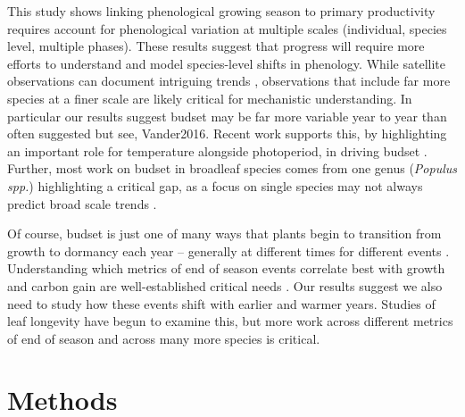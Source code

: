 \documentclass{article}[12pt]
\begin{document}
 This study shows linking phenological growing season to primary productivity requires account for phenological variation at multiple scales (individual, species level, multiple phases). These results suggest that progress will require more efforts to understand and model species-level shifts in phenology. While satellite observations can document intriguing trends \citep[e.g.,][]{Zohner2023}, observations that include far more species at a finer scale are likely critical for mechanistic understanding. In particular our results suggest budset may be far more variable year to year than often suggested \citep{Michelson2018} but see{, Vander2016}. Recent work supports this, by highlighting an important role for temperature alongside photoperiod, in driving budset \citep{Olsen2014,Rohde2011}. Further, most work on budset in broadleaf species comes from one genus (\emph{Populus spp.}) highlighting a critical gap, as a focus on single species may not always predict broad scale trends \citep{Morales-Castilla2024}. 
 
Of course, budset is just one of many ways that plants begin to transition from growth to dormancy each year -- generally at different times for different events \citep{Michelson2018}. Understanding which metrics of end of season events correlate best with growth and carbon gain are well-established critical needs \citep{GALLINAT2015}. Our results suggest we also need to study how these events shift with earlier and warmer years. Studies of leaf longevity have begun to examine this, but more work across different metrics of end of season and across many more species is critical.
 
 
\section{Methods} %
\end{document}
